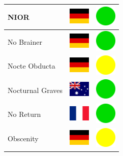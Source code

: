 \documentclass[12pt, a4paper, twoside]{report}
\begin{document}
\begin{center}
\begin{longtable}{|p{5cm}|p{2cm}|p{2cm}|}
			NIOR & \includegraphics[width=1cm]{4x3/de} & \includegraphics[width=1cm]{likes/y} \\ \hline
			No Brainer & \includegraphics[width=1cm]{4x3/de} & \includegraphics[width=1cm]{likes/y} \\ \hline
			Nocte Obducta & \includegraphics[width=1cm]{4x3/de} & \includegraphics[width=1cm]{likes/m} \\ \hline
			Nocturnal Graves & \includegraphics[width=1cm]{4x3/au} & \includegraphics[width=1cm]{likes/y} \\ \hline
			No Return & \includegraphics[width=1cm]{4x3/fr} & \includegraphics[width=1cm]{likes/y} \\ \hline
			Obscenity & \includegraphics[width=1cm]{4x3/de} & \includegraphics[width=1cm]{likes/m} \\ \hline

\end{longtable}
\end{center}
\end{document}
